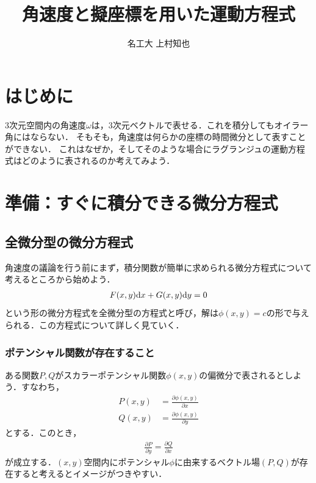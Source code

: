 \documentclass[a4j,10pt]{jsarticle}
\begin{document}
\title{角速度と擬座標を用いた運動方程式}
\author{名工大 上村知也}
\setlength{\baselineskip}{4.4mm}	%
\maketitle
\section{はじめに}
3次元空間内の角速度$\omega$は，3次元ベクトルで表せる．これを積分してもオイラー角にはならない．
そもそも，角速度は何らかの座標の時間微分として表すことができない．
これはなぜか，そしてそのような場合にラグランジュの運動方程式はどのように表されるのか考えてみよう．

\section{準備：すぐに積分できる微分方程式}

\subsection{全微分型の微分方程式}

角速度の議論を行う前にまず，積分関数が簡単に求められる微分方程式について考えるところから始めよう．
\begin{align}
    F(x,y){\rm d} x + G(x,y){\rm d} y=0
    \label{eq:zenbibun}  
\end{align}
という形の微分方程式を全微分型の方程式と呼び，解は$\phi(x,y) = c$の形で与えられる．この方程式について詳しく見ていく．

\subsubsection*{ポテンシャル関数が存在すること}
ある関数$P, Q$がスカラーポテンシャル関数$\phi(x,y)$の偏微分で表されるとしよう．すなわち，
\begin{subequations}
    \begin{align}
        P(x,y) &= \frac{\partial \phi(x,y)}{\partial x}\\
        Q(x,y) &= \frac{\partial \phi(x,y)}{\partial y}
    \end{align}
\end{subequations}
とする．このとき，
\begin{align}
    \frac{\partial P}{\partial y} = \frac{\partial Q}{\partial x}    
\end{align}
が成立する．$(x,y)$空間内にポテンシャル$\phi$に由来するベクトル場$(P,Q)$が存在すると考えるとイメージがつきやすい．
\end{document}
